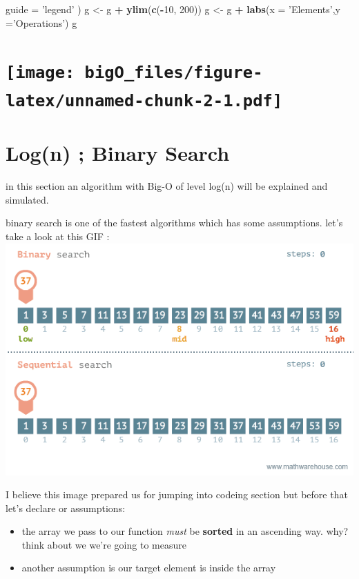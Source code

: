 \documentclass[]{article}
\newenvironment{Shaded}{\begin{snugshade}}{\end{snugshade}}
\newcommand{\KeywordTok}[1]{\textcolor[rgb]{0.13,0.29,0.53}{\textbf{#1}}}
\newcommand{\DataTypeTok}[1]{\textcolor[rgb]{0.13,0.29,0.53}{#1}}
\newcommand{\DecValTok}[1]{\textcolor[rgb]{0.00,0.00,0.81}{#1}}
\newcommand{\StringTok}[1]{\textcolor[rgb]{0.31,0.60,0.02}{#1}}
\newcommand{\OperatorTok}[1]{\textcolor[rgb]{0.81,0.36,0.00}{\textbf{#1}}}
\newcommand{\NormalTok}[1]{#1}
\begin{document}
\begin{Shaded}
\begin{Highlighting}[]
      \DataTypeTok{guide =} \StringTok{'legend'}
\NormalTok{)}
\NormalTok{g <-}\StringTok{ }\NormalTok{g }\OperatorTok{+}\StringTok{ }\KeywordTok{ylim}\NormalTok{(}\KeywordTok{c}\NormalTok{(}\OperatorTok{-}\DecValTok{10}\NormalTok{, }\DecValTok{200}\NormalTok{))}
\NormalTok{g <-}\StringTok{ }\NormalTok{g }\OperatorTok{+}\StringTok{ }\KeywordTok{labs}\NormalTok{(}\DataTypeTok{x =} \StringTok{'Elements'}\NormalTok{,}\DataTypeTok{y =}\StringTok{'Operations'}\NormalTok{)}
\NormalTok{g}
\end{Highlighting}
\end{Shaded}

\section[]{\texorpdfstring{\protect\texttt{[image: bigO\_files/figure-latex/unnamed-chunk-2-1.pdf]}}{}}\label{section}

\section{Log(n) ; Binary Search}\label{logn-binary-search}

in this section an algorithm with Big-O of level log(n) will be
explained and simulated.

binary search is one of the fastest algorithms which has some
assumptions. let's take a look at this GIF :
\includegraphics{./bins.gif}

I believe this image prepared us for jumping into codeing section but
before that let's declare or assumptions:

\begin{itemize}
\item
  the array we pass to our function \emph{must} be \textbf{sorted} in an
  ascending way. why? think about we we're going to measure
\item
  another assumption is our target element is inside the array
\end{itemize}
\end{document}
